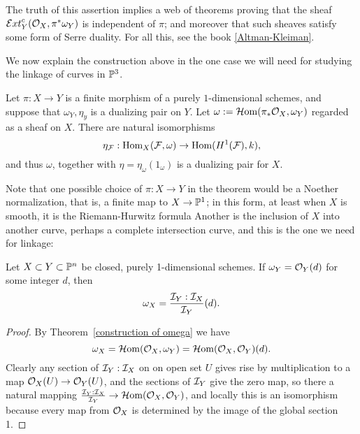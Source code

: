 The truth of this assertion implies a web of theorems proving that the sheaf 
$\sExt_{Y}^{c}(\cO_{X}, \pi^{*}\omega_{Y})$ is independent of $\pi$; and moreover that such sheaves satisfy some form of Serre duality. For all this, see the book
\ref{Altman-Kleiman}.

We now explain the construction above in the one case we will need for studying the linkage of curves in $\PP^{3}$.


\begin{theorem}\label{construction of omega}
Let $\pi: X \to Y$ is a finite morphism of a purely $1$-dimensional schemes, and suppose that
$\omega_{Y}, \eta_{y}$ is a dualizing pair on $Y$. 
Let $\omega := \sHom(\pi_{*}\cO_{X}, \omega_{Y})$ regarded as a sheaf on $X$. There are
natural isomorphisms 
$$
\eta_{\sF}: \Hom_{X}(\sF, \omega) \to \Hom(H^{1}(\sF), k),
$$
and thus $\omega$, together with $\eta = \eta_{\omega}(1_{\omega})$ is a dualizing pair for $X$.
\end{theorem}

Note that one possible choice of $\pi: X\to Y$ in the theorem would be a Noether normalization, that is, a finite map to $X \to \PP^{1}$; in this form, at least when $X$ is smooth, it is the Riemann-Hurwitz formula  Another is the inclusion of $X$ into another curve, perhaps a complete intersection curve, and this is the one we need for linkage:

\begin{corollary}\label{dualizing formula}
 Let $X\subset Y\subset \PP^{n}$ be closed, purely 1-dimensional schemes. If  $\omega_{Y} = \sO_{Y}(d)$ for some integer $d$, then 
 $$
 \omega_{X} = \frac{\sI_{Y}:\sI_{X}}{\sI_{Y}}(d).
 $$
\end{corollary}

\begin{proof}
By Theorem~\ref{construction of omega} we have 
$$
\omega_{X} = \sHom(\sO_{X}, \omega_{Y}) = \sHom(\sO_{X}, \sO_{Y})(d).
$$
Clearly any  section of $\sI_{Y}:\sI_{X}$ on on open set $U$ gives rise by multiplication to a
map   
$\sO_{X}(U) \to \sO_{Y}(U)$, and the sections of  $\sI_{Y}$ give the zero map,
so there a natural mapping $\frac{\sI_{Y}:\sI_{X}}{\sI_{Y}} \to \sHom(\sO_{X}, \sO_{Y})$,
and locally this is an isomorphism because every map from $\sO_{X}$ is determined by the image of the global section 1.
\end{proof}


